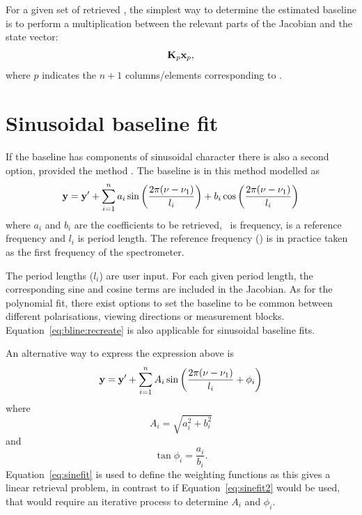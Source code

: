 For a given set of retrieved , the simplest way to determine the
estimated baseline is to perform a multiplication between the relevant parts of
the Jacobian and the state vector:
\begin{equation}
  \mathbf{K}_{p}\mathbf{x}_{p},
  \label{eq:bline:recreate}
\end{equation}
where $p$ indicates the $n+1$ columns/elements corresponding to .


\section{Sinusoidal baseline fit}
\label{sec:wfuns:sinefit}

If the baseline has components of sinusoidal character there is also a second
option, provided the method . The baseline is
in this method modelled as \citep{kuntz:97}
\begin{equation}
  \label{eq:sinefit}
  \mathbf{y} = \mathbf{y}' + \sum_{i=1}^n 
       a_i\sin\left(\frac{2\pi(\nu-\nu_{1})}{l_i}\right)+
       b_i\cos\left(\frac{2\pi(\nu-\nu_{1})}{l_i}\right)
\end{equation}
where $a_i$ and $b_i$ are the coefficients to be retrieved, \Frq\ is frequency,
 is a reference frequency and $l_i$ is period length. The reference
frequency () is in practice taken as the first frequency of the
spectrometer. 

The period lengths ($l_i$) are user input. For each given period length, the
corresponding sine and cosine terms are included in the Jacobian. As for the
polynomial fit, there exist options to set the baseline to be common between
different polarisations, viewing directions or measurement blocks.
Equation~\ref{eq:bline:recreate} is also applicable for sinusoidal baseline
fits.

An alternative way to express the expression above is
\begin{equation}
  \label{eq:sinefit2}
  \mathbf{y} = \mathbf{y}' + \sum_{i=1}^n A_i
             \sin\left(\frac{2\pi(\nu-\nu_{1})}{l_i} + \phi_i\right)
\end{equation}
where
\begin{equation}
  A_i = \sqrt{a_i^2+b_i^2}
\end{equation}
and
\begin{equation}
  \tan{\phi_i} = \frac{a_i}{b_i}.
\end{equation}
Equation~\ref{eq:sinefit} is used to define the weighting functions as this
gives a linear retrieval problem, in contrast to if Equation~\ref{eq:sinefit2}
would be used, that would require an iterative process to determine $A_i$
and $\phi_i$.




